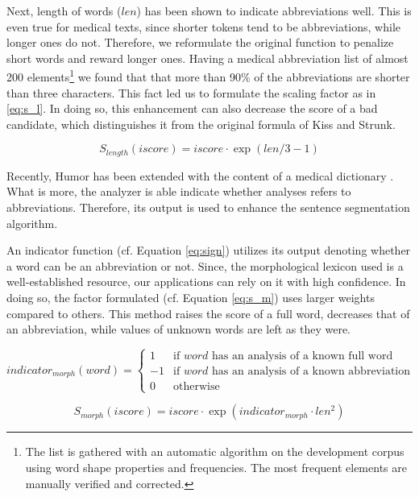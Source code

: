 Next, length of words ($len$) has been shown to indicate abbreviations well. 
This is even true for medical texts, since shorter tokens tend to be abbreviations, while longer ones do not. 
Therefore, we reformulate the original function to penalize short words and reward longer ones. 
Having a medical abbreviation list of almost 200 \label{sec:abbrev} elements\footnote{The list is gathered with an automatic algorithm on the development corpus using word shape properties and frequencies. The most frequent elements are manually verified and corrected.} 
we found that that more than 90\% of the abbreviations are shorter than three characters. 
This fact led us to formulate the scaling factor as in \eqref{eq:s_l}. 
In doing so, this enhancement can also decrease the score of a bad candidate, which distinguishes it from the original formula of Kiss and Strunk.

\begin{equation} \label{eq:s_l}
S_{length}(iscore)= iscore \cdot \exp{(len/3-1)}
\end{equation}

Recently, Humor \cite{Proszeky1994,Proszeky2005}  has been extended with the content of a medical dictionary \cite{Orosz2013}. 
What is more, the analyzer is able indicate whether analyses refers to abbreviations.
Therefore, its output is used to enhance the sentence segmentation algorithm.  

An indicator function (cf. Equation \ref{eq:sign}) utilizes its output denoting whether a word can be an abbreviation or not.
Since, the morphological lexicon used is a well-established resource, our applications can rely on it with high confidence.
In doing so, the factor formulated (cf. Equation \ref{eq:s_m}) uses larger weights compared to others. 
This method raises the score of a full word, decreases that of an abbreviation, while values of unknown words are left as they were.

\begin{equation}\label{eq:sign}
 indicator_{morph}(word) =
  \begin{cases}
   1  & \text{if $word$ has an analysis of a known full word} \\
   -1 & \text{if $word$ has an analysis of a known abbreviation} \\
   0  & \text{otherwise}
  \end{cases}
\end{equation}

\begin{equation} \label{eq:s_m}
S_{morph}(iscore)= iscore \cdot \exp{( indicator_{morph} \cdot len^2)}
\end{equation}

